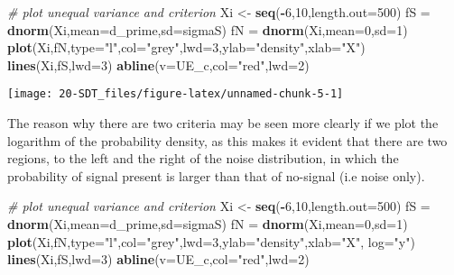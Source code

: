 \documentclass[
]{book}
\newenvironment{Shaded}{\begin{snugshade}}{\end{snugshade}}
\newcommand{\AttributeTok}[1]{\textcolor[rgb]{0.13,0.29,0.53}{#1}}
\newcommand{\CommentTok}[1]{\textcolor[rgb]{0.56,0.35,0.01}{\textit{#1}}}
\newcommand{\DecValTok}[1]{\textcolor[rgb]{0.00,0.00,0.81}{#1}}
\newcommand{\FunctionTok}[1]{\textcolor[rgb]{0.13,0.29,0.53}{\textbf{#1}}}
\newcommand{\NormalTok}[1]{#1}
\newcommand{\OtherTok}[1]{\textcolor[rgb]{0.56,0.35,0.01}{#1}}
\newcommand{\SpecialCharTok}[1]{\textcolor[rgb]{0.81,0.36,0.00}{\textbf{#1}}}
\newcommand{\StringTok}[1]{\textcolor[rgb]{0.31,0.60,0.02}{#1}}
\begin{document}
\begin{Shaded}
\begin{Highlighting}[]
\CommentTok{\# plot unequal variance and criterion}
\NormalTok{Xi }\OtherTok{\textless{}{-}} \FunctionTok{seq}\NormalTok{(}\SpecialCharTok{{-}}\DecValTok{6}\NormalTok{,}\DecValTok{10}\NormalTok{,}\AttributeTok{length.out=}\DecValTok{500}\NormalTok{)}
\NormalTok{fS }\OtherTok{=} \FunctionTok{dnorm}\NormalTok{(Xi,}\AttributeTok{mean=}\NormalTok{d\_prime,}\AttributeTok{sd=}\NormalTok{sigmaS)}
\NormalTok{fN }\OtherTok{=} \FunctionTok{dnorm}\NormalTok{(Xi,}\AttributeTok{mean=}\DecValTok{0}\NormalTok{,}\AttributeTok{sd=}\DecValTok{1}\NormalTok{)}
\FunctionTok{plot}\NormalTok{(Xi,fN,}\AttributeTok{type=}\StringTok{"l"}\NormalTok{,}\AttributeTok{col=}\StringTok{"grey"}\NormalTok{,}\AttributeTok{lwd=}\DecValTok{3}\NormalTok{,}\AttributeTok{ylab=}\StringTok{"density"}\NormalTok{,}\AttributeTok{xlab=}\StringTok{"X"}\NormalTok{)}
\FunctionTok{lines}\NormalTok{(Xi,fS,}\AttributeTok{lwd=}\DecValTok{3}\NormalTok{)}
\FunctionTok{abline}\NormalTok{(}\AttributeTok{v=}\NormalTok{UE\_c,}\AttributeTok{col=}\StringTok{"red"}\NormalTok{,}\AttributeTok{lwd=}\DecValTok{2}\NormalTok{)}
\end{Highlighting}
\end{Shaded}

\begin{center}\texttt{[image: 20-SDT\_files/figure-latex/unnamed-chunk-5-1]} \end{center}

The reason why there are two criteria may be seen more clearly if we plot the logarithm of the probability density, as this makes it evident that there are two regions, to the left and the right of the noise distribution, in which the probability of signal present is larger than that of no-signal (i.e noise only).

\begin{Shaded}
\begin{Highlighting}[]
\CommentTok{\# plot unequal variance and criterion}
\NormalTok{Xi }\OtherTok{\textless{}{-}} \FunctionTok{seq}\NormalTok{(}\SpecialCharTok{{-}}\DecValTok{6}\NormalTok{,}\DecValTok{10}\NormalTok{,}\AttributeTok{length.out=}\DecValTok{500}\NormalTok{)}
\NormalTok{fS }\OtherTok{=} \FunctionTok{dnorm}\NormalTok{(Xi,}\AttributeTok{mean=}\NormalTok{d\_prime,}\AttributeTok{sd=}\NormalTok{sigmaS)}
\NormalTok{fN }\OtherTok{=} \FunctionTok{dnorm}\NormalTok{(Xi,}\AttributeTok{mean=}\DecValTok{0}\NormalTok{,}\AttributeTok{sd=}\DecValTok{1}\NormalTok{)}
\FunctionTok{plot}\NormalTok{(Xi,fN,}\AttributeTok{type=}\StringTok{"l"}\NormalTok{,}\AttributeTok{col=}\StringTok{"grey"}\NormalTok{,}\AttributeTok{lwd=}\DecValTok{3}\NormalTok{,}\AttributeTok{ylab=}\StringTok{"density"}\NormalTok{,}\AttributeTok{xlab=}\StringTok{"X"}\NormalTok{, }\AttributeTok{log=}\StringTok{"y"}\NormalTok{)}
\FunctionTok{lines}\NormalTok{(Xi,fS,}\AttributeTok{lwd=}\DecValTok{3}\NormalTok{)}
\FunctionTok{abline}\NormalTok{(}\AttributeTok{v=}\NormalTok{UE\_c,}\AttributeTok{col=}\StringTok{"red"}\NormalTok{,}\AttributeTok{lwd=}\DecValTok{2}\NormalTok{)}
\end{Highlighting}
\end{Shaded}
\end{document}

